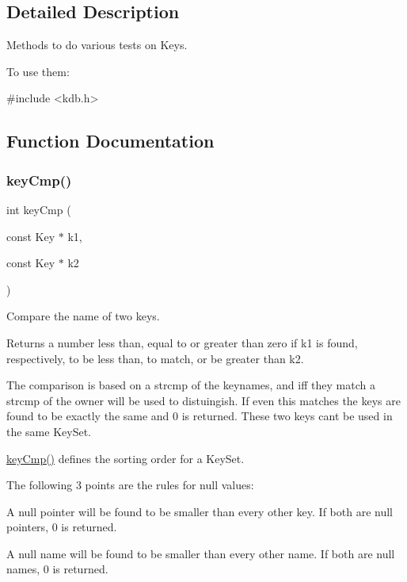 \subsection{Detailed Description}
Methods to do various tests on Keys. 

To use them\+: 
\begin{DoxyCode}
\textcolor{preprocessor}{#include <kdb.h>}
\end{DoxyCode}
 

\subsection{Function Documentation}
\mbox{\label{group__keytest_gaf6e66e12fe04d535a5d1c8218ced803e}} 
\subsubsection{\texorpdfstring{key\+Cmp()}{keyCmp()}}
{\footnotesize\ttfamily int key\+Cmp (\begin{DoxyParamCaption}\item[{const Key $\ast$}]{k1,  }\item[{const Key $\ast$}]{k2 }\end{DoxyParamCaption})}



Compare the name of two keys. 

\begin{DoxyReturn}{Returns}
a number less than, equal to or greater than zero if k1 is found, respectively, to be less than, to match, or be greater than k2.
\end{DoxyReturn}
The comparison is based on a strcmp of the keynames, and iff they match a strcmp of the owner will be used to distuingish. If even this matches the keys are found to be exactly the same and 0 is returned. These two keys can\textquotesingle{}t be used in the same Key\+Set.

\hyperlink{group__keytest_gaf6e66e12fe04d535a5d1c8218ced803e}{key\+Cmp()} defines the sorting order for a Key\+Set.

The following 3 points are the rules for null values\+:


\begin{DoxyItemize}
\item A null pointer will be found to be smaller than every other key. If both are null pointers, 0 is returned.
\item A null name will be found to be smaller than every other name. If both are null names, 0 is returned.
\end{DoxyItemize}

